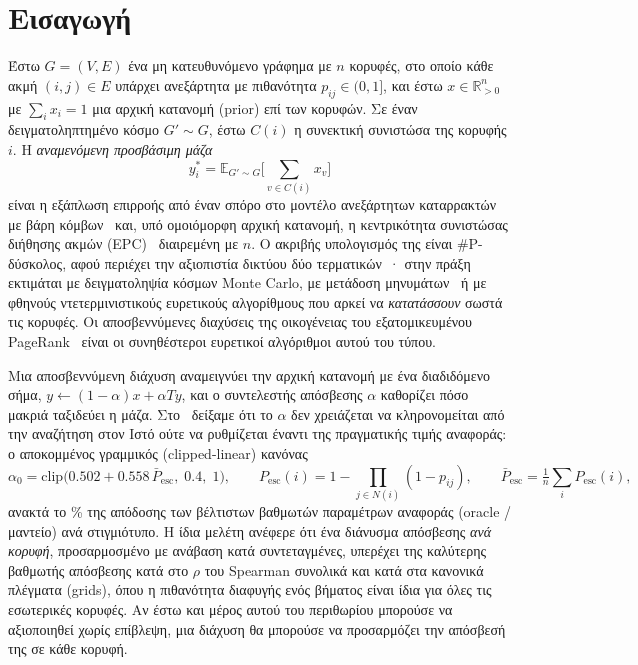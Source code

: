 \documentclass[11pt,a4paper]{article}
\theoremstyle{definition}
\theoremstyle{plain}
\newcommand{\Pesc}{P_{\mathrm{esc}}}
\newcommand{\Pescbar}{\bar{P}_{\mathrm{esc}}}
\newcommand{\clip}{\mathrm{clip}}
\newcommand{\E}{\mathbb{E}}
\begin{document}
\section{Εισαγωγή}\label{sec:intro}

Έστω $G=(V,E)$ ένα μη κατευθυνόμενο γράφημα με $n$ κορυφές, στο οποίο κάθε ακμή $(i,j)\in E$ υπάρχει ανεξάρτητα με πιθανότητα $p_{ij}\in(0,1]$, και έστω $x\in\mathbb{R}^n_{>0}$ με $\sum_ix_i=1$ μια αρχική κατανομή (prior) επί των κορυφών. Σε έναν δειγματοληπτημένο κόσμο $G'\sim G$, έστω $C(i)$ η συνεκτική συνιστώσα της κορυφής $i$. Η \emph{αναμενόμενη προσβάσιμη μάζα}
\begin{equation}\label{eq:target}
y^*_i=\E_{G'\sim G}\Big[\sum_{v\in C(i)}x_v\Big]
\end{equation}
είναι η εξάπλωση επιρροής από έναν σπόρο στο μοντέλο ανεξάρτητων καταρρακτών με βάρη κόμβων~\cite{kkt03} και, υπό ομοιόμορφη αρχική κατανομή, η κεντρικότητα συνιστώσας διήθησης ακμών (EPC)~\cite{hubba08,cytohubba14} διαιρεμένη με $n$. Ο ακριβής υπολογισμός της είναι \#P-δύσκολος, αφού περιέχει την αξιοπιστία δικτύου δύο τερματικών~\cite{provanball83}· στην πράξη εκτιμάται με δειγματοληψία κόσμων Monte Carlo, με μετάδοση μηνυμάτων~\cite{knz14} ή με φθηνούς ντετερμινιστικούς ευρετικούς αλγορίθμους που αρκεί να \emph{κατατάσσουν} σωστά τις κορυφές. Οι αποσβεννύμενες διαχύσεις της οικογένειας του εξατομικευμένου PageRank~\cite{pagerank99,jeh03,haveliwala03,gleich15} είναι οι συνηθέστεροι ευρετικοί αλγόριθμοι αυτού του τύπου.

Μια αποσβεννύμενη διάχυση αναμειγνύει την αρχική κατανομή με ένα διαδιδόμενο σήμα, $y\leftarrow(1-\alpha)x+\alpha Ty$, και ο συντελεστής απόσβεσης $\alpha$ καθορίζει πόσο μακριά ταξιδεύει η μάζα. Στο~\cite{konstantellos26} δείξαμε ότι το $\alpha$ δεν χρειάζεται να κληρονομείται από την αναζήτηση στον Ιστό ούτε να ρυθμίζεται έναντι της πραγματικής τιμής αναφοράς: ο αποκομμένος γραμμικός (clipped-linear) κανόνας
\begin{equation}\label{eq:rule}
\alpha_0=\clip\big(0.502+0.558\,\Pescbar,\;0.4,\;1\big),\qquad \Pesc(i)=1-\prod_{j\in N(i)}(1-p_{ij}),\qquad \Pescbar=\tfrac1n\textstyle\sum_i\Pesc(i),
\end{equation}
ανακτά το \PrevPctOracle\% της απόδοσης των βέλτιστων βαθμωτών παραμέτρων αναφοράς (oracle / μαντείο) ανά στιγμιότυπο. Η ίδια μελέτη ανέφερε ότι ένα διάνυσμα απόσβεσης \emph{ανά κορυφή}, προσαρμοσμένο με ανάβαση κατά συντεταγμένες, υπερέχει της καλύτερης βαθμωτής απόσβεσης κατά \PrevHeadAll{} στο $\rho$ του Spearman συνολικά και κατά \PrevHeadGrid{} στα κανονικά πλέγματα (grids), όπου η πιθανότητα διαφυγής ενός βήματος είναι ίδια για όλες τις εσωτερικές κορυφές. Αν έστω και μέρος αυτού του περιθωρίου μπορούσε να αξιοποιηθεί χωρίς επίβλεψη, μια διάχυση θα μπορούσε να προσαρμόζει την απόσβεσή της σε κάθε κορυφή.
\end{document}
